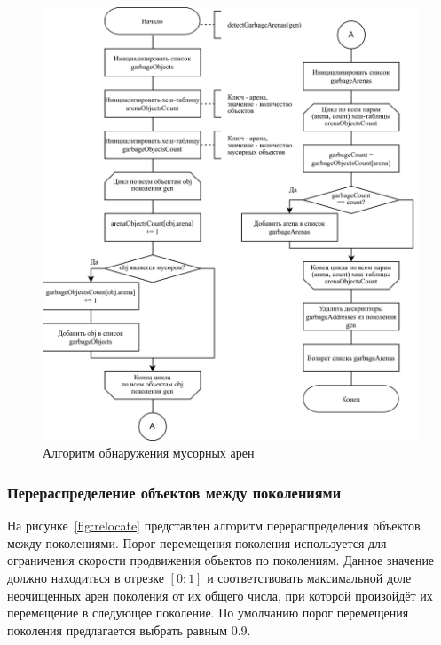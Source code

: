 \begin{figure}[H]
	\centering
	\includegraphics[width=\textwidth]{assets/sweep-2.png}
	\caption{Алгоритм обнаружения мусорных арен}
	\label{fig:sweep-2}
\end{figure}

%

\subsubsection{Перераспределение объектов между поколениями}

На рисунке~\ref{fig:relocate} представлен алгоритм перераспределения объектов между поколениями. Порог перемещения поколения используется для ограничения скорости продвижения объектов по поколениям. Данное значение должно находиться в отрезке $[0; 1]$ и соответствовать максимальной доле неочищенных арен поколения от их общего числа, при которой произойдёт их перемещение в следующее поколение. По умолчанию порог перемещения поколения предлагается выбрать равным 0.9.

